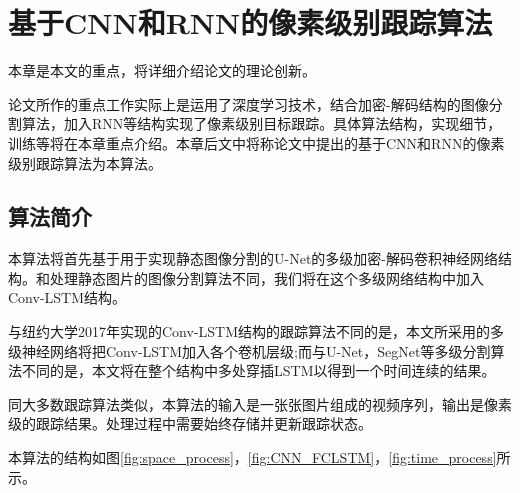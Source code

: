 
\chapter{基于CNN和RNN的像素级别跟踪算法}
本章是本文的重点，将详细介绍论文的理论创新。
\par
论文所作的重点工作实际上是运用了深度学习技术，结合加密-解码结构的图像分割算法，加入RNN等结构实现了像素级别目标跟踪。具体算法结构，实现细节，训练等将在本章重点介绍。本章后文中将称论文中提出的基于CNN和RNN的像素级别跟踪算法为本算法。

\section{算法简介}
本算法将首先基于用于实现静态图像分割的U-Net\supercite{ronneberger2015u}的多级加密-解码卷积神经网络结构。和处理静态图片的图像分割算法不同，我们将在这个多级网络结构中加入Conv-LSTM结构。
\par
与纽约大学2017年实现的Conv-LSTM结构的跟踪算法不同的是，本文所采用的多级神经网络将把Conv-LSTM加入各个卷机层级;而与U-Net，SegNet等多级分割算法不同的是，本文将在整个结构中多处穿插LSTM以得到一个时间连续的结果。
\par
同大多数跟踪算法类似，本算法的输入是一张张图片组成的视频序列，输出是像素级的跟踪结果。处理过程中需要始终存储并更新跟踪状态。
\par
本算法的结构如图\ref{fig:space_process}，\ref{fig:CNN_FCLSTM}，\ref{fig:time_process}所示。

